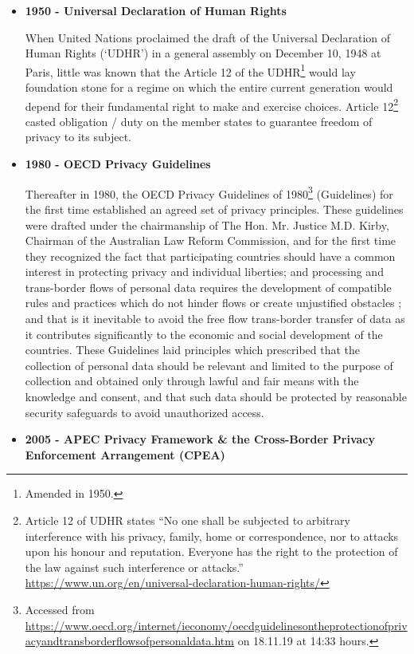 \begin{multicols}{2}
\begin{itemize}

\item[{\bf 1)}] \textbf{1950 - Universal Declaration of Human Rights}

When United Nations proclaimed the draft of the Universal Declaration of Human Rights (‘UDHR’) in a general assembly on December 10, 1948 at Paris, little was known that the Article 12 of the UDHR\footnote{Amended in 1950.} would lay foundation stone for a regime on which the entire current generation would depend for their fundamental right to make and exercise choices. Article 12\footnote{Article 12 of UDHR states “No one shall be subjected to arbitrary interference with his privacy, family, home or correspondence, nor to attacks upon his honour and reputation. Everyone has the right to the protection of the law against such interference or attacks.”  \url{https://www.un.org/en/universal-declaration-human-rights/}} casted obligation / duty on the member states to guarantee freedom of privacy to its subject.

\item[{\bf 2)}] \textbf{1980 - OECD Privacy Guidelines }

Thereafter in 1980, the OECD Privacy Guidelines of 1980\footnote{ Accessed from \url{https://www.oecd.org/internet/ieconomy/oecdguidelinesontheprotectionofprivacyandtransborderflowsofpersonaldata.htm} on 18.11.19 at 14:33 hours.} (Guidelines) for the first time established an agreed set of privacy principles. These guidelines were drafted under the chairmanship of The Hon. Mr. Justice M.D. Kirby, Chairman of the Australian Law Reform Commission, and for the first time they recognized the fact that participating countries should have a common interest in protecting privacy and individual liberties; and processing and trans-border flows of personal data requires the development of compatible rules and practices which do not hinder flows or create unjustified obstacles ; and that is it inevitable to avoid the free flow trans-border transfer of data as it contributes significantly to the economic and social development of the countries. These Guidelines laid principles which prescribed that the collection of personal data should be relevant and limited to the purpose of collection and obtained only through lawful and fair means with the knowledge and consent, and that such data should be protected by reasonable security safeguards to avoid unauthorized access.

\item[{\bf 3)}] \textbf{2005 - APEC Privacy Framework \& the Cross-Border Privacy Enforcement Arrangement (CPEA) }


\end{itemize}
\end{multicols}
